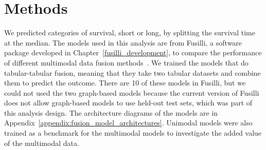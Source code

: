 \section{Methods}

We predicted categories of survival, short or long, by splitting the survival time at the median.
The models used in this analysis are from Fusilli, a software package developed in Chapter~\ref{fusilli_development}, to compare the performance of different multimodal data fusion methods~\cite{townendFlorencejtFusilliFusilli2024}.
We trained the models that do tabular-tabular fusion, meaning that they take two tabular datasets and combine them to predict the outcome.
There are 10 of these models in Fusilli, but we could not used the two graph-based models because the current version of Fusilli does not allow graph-based models to use held-out test sets, which was part of this analysis design.
The architecture diagrams of the models are in Appendix~\ref{appendix:fusion_model_architectures}.
Unimodal models were also trained as a benchmark for the multimodal models to investigate the added value of the multimodal data.

